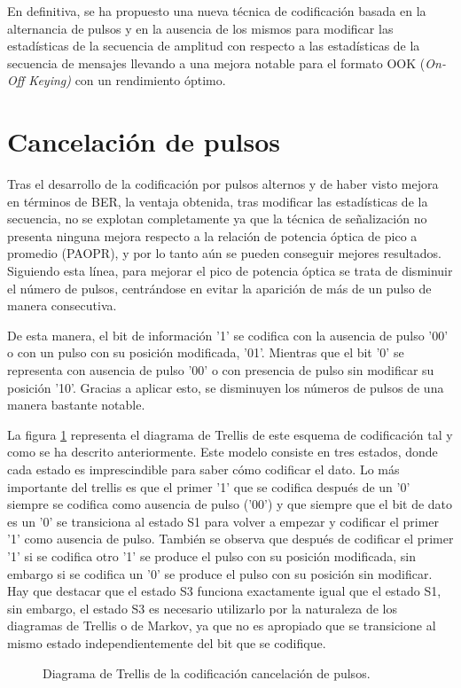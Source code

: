 En definitiva, se ha propuesto una nueva técnica de codificación basada en la 
alternancia de pulsos y en la ausencia de los mismos para modificar las estadísticas de la
secuencia de amplitud con respecto a las estadísticas de la secuencia de mensajes llevando
a una mejora notable para el formato OOK (\textit{On-Off Keying)} 
con un rendimiento óptimo.

\section{Cancelación de pulsos}

Tras el desarrollo de la codificación por pulsos alternos y de haber visto mejora en 
términos de BER, la ventaja obtenida, tras modificar las estadísticas de la secuencia,
no se explotan completamente ya que la técnica de señalización no presenta ninguna mejora
respecto a la relación de potencia óptica de pico a promedio (PAOPR), y por lo tanto aún
se pueden conseguir mejores resultados. Siguiendo esta línea, para mejorar el pico de 
potencia óptica se trata de disminuir el número de pulsos, centrándose en evitar la 
aparición de más de un pulso de manera consecutiva. \cite{anto_cancel}

De esta manera, el bit de información '1' se codifica con la ausencia de pulso '00' 
o con un pulso con su posición modificada, '01'. Mientras que el bit '0' se representa con
ausencia de pulso '00' o con presencia de pulso sin modificar su posición '10'. Gracias
a aplicar esto, se disminuyen los números de pulsos de una manera bastante notable. 

La figura \ref{trellis_cancelacion} representa el diagrama de Trellis de este esquema
de codificación tal y como se ha descrito anteriormente. Este modelo consiste en tres 
estados, donde cada estado es imprescindible para saber cómo codificar el dato.
Lo más importante del trellis es que el primer '1' que se codifica después de un '0'
siempre se codifica como ausencia de pulso ('00') y que siempre que el bit de dato
es un '0' se transiciona al estado S1 para volver a empezar y codificar el primer '1'
como ausencia de pulso. También se observa que después de codificar el primer '1' 
si se codifica otro '1' se produce el pulso con su posición modificada, sin embargo si 
se codifica un '0' se produce el pulso con su posición sin modificar. 
Hay que destacar que el estado S3 funciona exactamente igual que el estado S1, sin 
embargo, el estado S3 es necesario utilizarlo
por la naturaleza de los diagramas de Trellis o de Markov, 
ya que no es apropiado que se transicione al mismo estado independientemente del bit 
que se codifique.
\newpage
\begin{figure}[ht]
    \centering
    
    \caption{\small{Diagrama de Trellis de la codificación cancelación de pulsos.}}
    \label{trellis_cancelacion}%
\end{figure}

